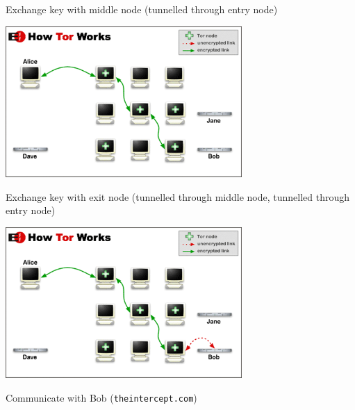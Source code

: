 \begin{frame}
{    Exchange key with middle node (tunnelled through entry node)
  }
  {
    \begin{center}
      \includegraphics[width=9cm]{tor4}
    \end{center}
    Exchange key with exit node (tunnelled through middle node, tunnelled
    through entry node)
  }
  {
    \begin{center}
      \includegraphics[width=9cm]{tor5}
    \end{center}
    Communicate with Bob (\texttt{theintercept.com})
  }
\end{frame}


